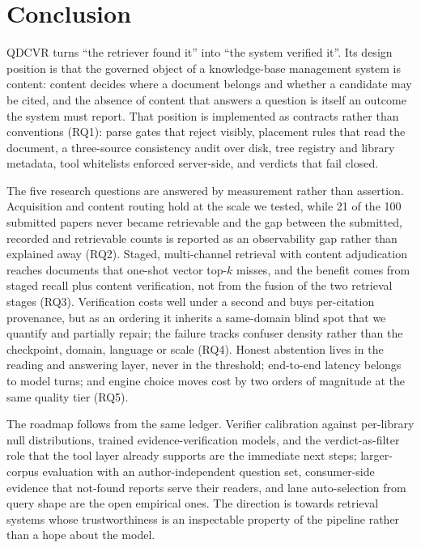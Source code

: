 \section{Conclusion}
\label{sec:conclusion}

QDCVR turns ``the retriever found it'' into ``the system verified it''. Its
design position is that the governed object of a knowledge-base management
system is content: content decides where a document belongs and whether a
candidate may be cited, and the absence of content that answers a question is
itself an outcome the system must report. That position is implemented as
contracts rather than conventions (RQ1): parse gates that reject visibly,
placement rules that read the document, a three-source consistency audit over
disk, tree registry and library metadata, tool whitelists enforced server-side,
and verdicts that fail closed.

The five research questions are answered by measurement rather than
assertion. Acquisition and content routing hold at the scale we tested, while
21 of the 100 submitted papers never became retrievable and the gap between the
submitted, recorded and retrievable counts is reported as an observability gap
rather than explained away (RQ2). Staged, multi-channel retrieval with content
adjudication reaches documents that one-shot vector top-$k$ misses, and the
benefit comes from staged recall plus content verification, not from the fusion
of the two retrieval stages (RQ3). Verification costs well under a second and
buys per-citation provenance, but as an ordering it inherits a same-domain
blind spot that we quantify and partially repair; the failure tracks confuser
density rather than the checkpoint, domain, language or scale (RQ4). Honest
abstention lives in the reading and answering layer, never in the threshold;
end-to-end latency belongs to model turns; and engine choice moves cost by two
orders of magnitude at the same quality tier (RQ5).

The roadmap follows from the same ledger. Verifier calibration against
per-library null distributions, trained evidence-verification models, and the
verdict-as-filter role that the tool layer already supports are the immediate
next steps; larger-corpus evaluation with an author-independent question set,
consumer-side evidence that not-found reports serve their readers, and lane
auto-selection from query shape are the open empirical ones. The direction is
towards retrieval systems whose trustworthiness is an inspectable property of
the pipeline rather than a hope about the model.
